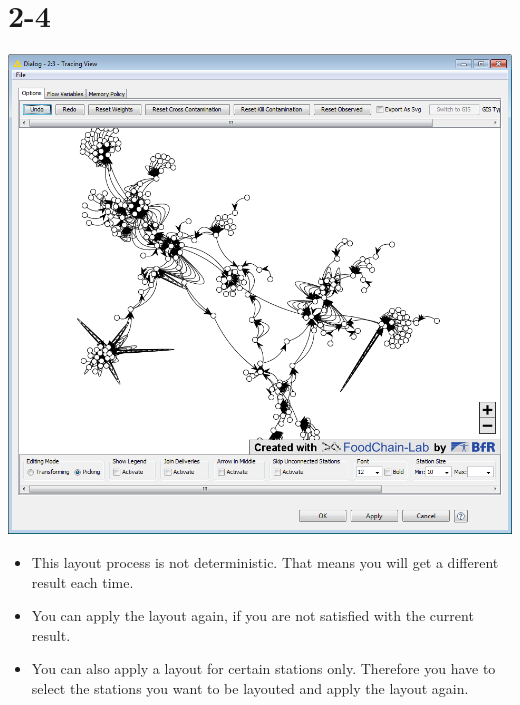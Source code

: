 \documentclass{beamer}
\begin{document}
\section{2-4}
\begin{frame}
	\begin{center}
  		\includegraphics[height=0.55\textheight]{2-4.png}
	\end{center}
	\begin{itemize}
		\item This layout process is not deterministic. That means you will get a different result each time.
		\item You can apply the layout again, if you are not satisfied with the current result.
		\item You can also apply a layout for certain stations only. Therefore you have to select the stations you want to be layouted and apply the layout again.
	\end{itemize}
\end{frame}
\end{document}
